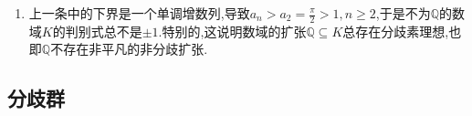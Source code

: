 \begin{enumerate}
\begin{proof}
    	取对称凸集$X_t=\{(z_{\tau})\in K_{\mathbb{R}}\mid\sum|z_{\tau}|<t\}$,那么$\mathrm{Vol}(X_t)=2^{r_1}\pi^{r_2}\frac{t^n}{n!}$.当$\mathrm{Vol}(X_t)=2^n\sqrt{|d_K|}+\varepsilon$时按照Minkowski格点定理,存在$0\not=\alpha\in\mathscr{O}_K$使得$j\alpha\in X_t$.然后有:
    	\begin{align*}
    	1&\le|\mathrm{N}_{K/\mathbb{Q}}(\alpha)|=\prod|\tau(\alpha)|\le\left(\frac{\sum|\tau(\alpha)|}{n}\right)^n\\&=\left(\frac{t}{n}\right)^n=\frac{n!}{2^{r_1}\pi^{r_2}n^n}2^n\sqrt{|d_K|}+c\varepsilon
    	\end{align*}
    	
    	得到$\sqrt{|d_K|}\ge\left(\frac{\pi}{4}\right)^{r_2}\frac{n^n}{n!}-c'\varepsilon$.这里$|d_K|$是整数,于是选取足够小的$\varepsilon$会导致$\sqrt{|d_K|}\ge\left(\frac{\pi}{4}\right)^{r_2}\frac{n^n}{n!}$,再用下$r_2\le n/2$.
    \end{proof}
    \item 上一条中的下界是一个单调增数列,导致$a_n>a_2=\frac{\pi}{2}>1,n\ge2$,于是不为$\mathbb{Q}$的数域$K$的判别式总不是$\pm1$.特别的,这说明数域的扩张$\mathbb{Q}\subseteq K$总存在分歧素理想,也即$\mathbb{Q}$不存在非平凡的非分歧扩张.
\end{enumerate}
\newpage
\subsection{分歧群}

